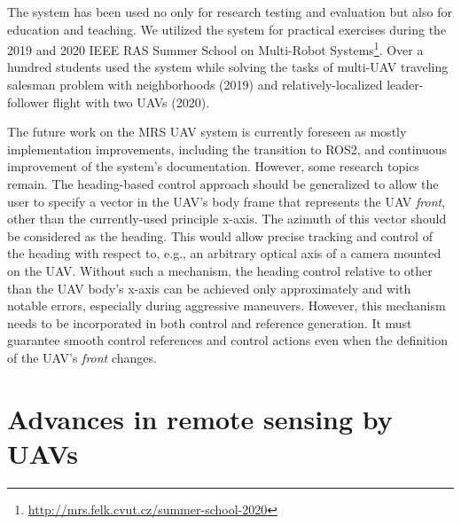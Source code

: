 \documentclass[a4paper,11pt,twoside,openright]{book}
\begin{document}
The system has been used no only for research testing and evaluation but also for education and teaching.
We utilized the system for practical exercises during the 2019 and 2020 \acs{IEEE} \acs{RAS} Summer School on Multi-Robot Systems\footnote{\url{http://mrs.felk.cvut.cz/summer-school-2020}}.
Over a hundred students used the system while solving the tasks of multi-\ac{UAV} traveling salesman problem with neighborhoods (2019) and relatively-localized leader-follower flight with two \acp{UAV} (2020).

The future work on the MRS UAV system is currently foreseen as mostly implementation improvements, including the transition to \acs{ROS}2, and continuous improvement of the system's documentation.
However, some research topics remain.
The heading-based control approach should be generalized to allow the user to specify a vector in the \ac{UAV}'s body frame that represents the \ac{UAV} \emph{front}, other than the currently-used principle x-axis.
The azimuth of this vector should be considered as the heading.
This would allow precise tracking and control of the heading with respect to, e.g., an arbitrary optical axis of a camera mounted on the \ac{UAV}.
Without such a mechanism, the heading control relative to other than the \ac{UAV} body's x-axis can be achieved only approximately and with notable errors, especially during aggressive maneuvers.
However, this mechanism needs to be incorporated in both control and reference generation.
It must guarantee smooth control references and control actions even when the definition of the \ac{UAV}'s \emph{front} changes.



\section{Advances in remote sensing by UAVs}
\end{document}

